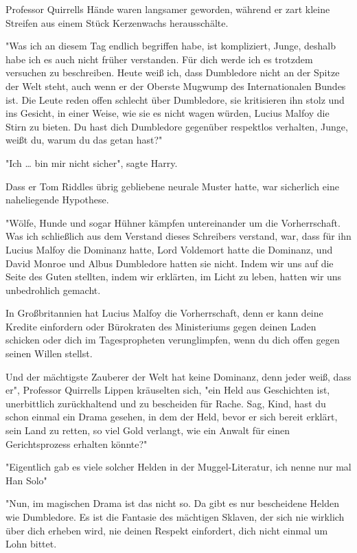 {Professor Quirrells Hände waren langsamer geworden, während er zart kleine Streifen aus einem Stück Kerzenwachs herausschälte.

"Was ich an diesem Tag endlich begriffen habe, ist kompliziert, Junge, deshalb habe ich es auch nicht früher verstanden. Für dich werde ich es trotzdem versuchen zu beschreiben. Heute weiß ich, dass Dumbledore nicht an der Spitze der Welt steht, auch wenn er der Oberste Mugwump des Internationalen Bundes ist. Die Leute reden offen schlecht über Dumbledore, sie kritisieren ihn stolz und ins Gesicht, in einer Weise, wie sie es nicht wagen würden, Lucius Malfoy die Stirn zu bieten. Du hast dich Dumbledore gegenüber respektlos verhalten, Junge, weißt du, warum du das getan hast?"

"Ich … bin mir nicht sicher", sagte Harry.

Dass er Tom Riddles übrig gebliebene neurale Muster hatte, war sicherlich eine naheliegende Hypothese.

"Wölfe, Hunde und sogar Hühner kämpfen untereinander um die Vorherrschaft. Was ich schließlich aus dem Verstand dieses Schreibers verstand, war, dass für ihn Lucius Malfoy die Dominanz hatte, Lord Voldemort hatte die Dominanz, und David Monroe und Albus Dumbledore hatten sie nicht. Indem wir uns auf die Seite des Guten stellten, indem wir erklärten, im Licht zu leben, hatten wir uns unbedrohlich gemacht.

In Großbritannien hat Lucius Malfoy die Vorherrschaft, denn er kann deine Kredite einfordern oder Bürokraten des Ministeriums gegen deinen Laden schicken oder dich im Tagespropheten verunglimpfen, wenn du dich offen gegen seinen Willen stellst.

Und der mächtigste Zauberer der Welt hat keine Dominanz, denn jeder weiß, dass er", Professor Quirrells Lippen kräuselten sich, "ein Held aus Geschichten ist, unerbittlich zurückhaltend und zu bescheiden für Rache. Sag, Kind, hast du schon einmal ein Drama gesehen, in dem der Held, bevor er sich bereit erklärt, sein Land zu retten, so viel Gold verlangt, wie ein Anwalt für einen Gerichtsprozess erhalten könnte?"

"Eigentlich gab es viele solcher Helden in der Muggel-Literatur, ich nenne nur mal Han Solo"

"Nun, im magischen Drama ist das nicht so. Da gibt es nur bescheidene Helden wie Dumbledore. Es ist die Fantasie des mächtigen Sklaven, der sich nie wirklich über dich erheben wird, nie deinen Respekt einfordert, dich nicht einmal um Lohn bittet.

}
